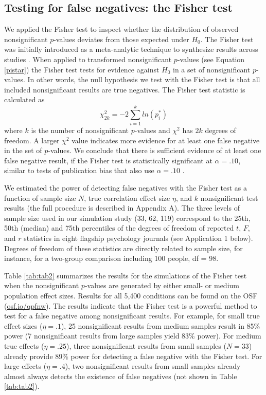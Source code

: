 \documentclass{article}
\begin{document}
\subsection*{Testing for false negatives: the Fisher test}

We applied the Fisher test to inspect whether the distribution of observed nonsignificant $p$-values deviates from those expected under $H_0$. The Fisher test was initially introduced as a meta-analytic technique to synthesize results across studies \cite{Fisher1925-jl,Hedges1985-dy}. When applied to transformed nonsignificant $p$-values (see Equation \ref{pistar}) the Fisher test tests for evidence against $H_0$ in a set of nonsignificant $p$-values. In other words, the null hypothesis we test with the Fisher test is that all included nonsignificant results are true negatives. The Fisher test statistic is calculated as
\begin{equation}
\label{fishertest}
\chi^2_{2k}=-2\sum\limits^k_{i=1}ln(p^*_i)
\end{equation}
where $k$ is the number of nonsignificant $p$-values and $\chi^2$ has $2k$ degrees of freedom. A larger $\chi^2$ value indicates more evidence for at least one false negative in the set of $p$-values. We conclude that there is sufficient evidence of at least one false negative result, if the Fisher test is statistically significant at $\alpha=.10$, similar to tests of publication bias that also use $\alpha=.10$ \cite{Sterne2000-wh,Ioannidis2007-hh,Francis2012-kw}.

We estimated the power of detecting false negatives with the Fisher test as a function of sample size $N$, true correlation effect size $\eta$, and $k$ nonsignificant test results (the full procedure is described in Appendix A). The three levels of sample size used in our simulation study (33, 62, 119) correspond to the 25th, 50th (median) and 75th percentiles of the degrees of freedom of reported $t$, $F$, and $r$ statistics in eight flagship psychology journals (see Application 1 below). Degrees of freedom of these statistics are directly related to sample size, for instance, for a two-group comparison including 100 people, df = 98. 

Table \ref{tab:tab2} summarizes the results for the simulations of the Fisher test when the nonsignificant $p$-values are generated by either small- or medium population effect sizes. Results for all 5,400 conditions can be found on the OSF (\url{osf.io/qpfnw}). The results indicate that the Fisher test is a powerful method to test for a false negative among nonsignificant results. For example, for small true effect sizes ($\eta=.1$), 25 nonsignificant results from medium samples result in 85\% power (7 nonsignificant results from large samples yield 83\% power). For medium true effects ($\eta=.25$), three nonsignificant results from small samples ($N=33$) already provide 89\% power for detecting a false negative with the Fisher test. For large effects ($\eta=.4$), two nonsignificant results from small samples already almost always detects the existence of false negatives (not shown in Table \ref{tab:tab2}).
\end{document}
